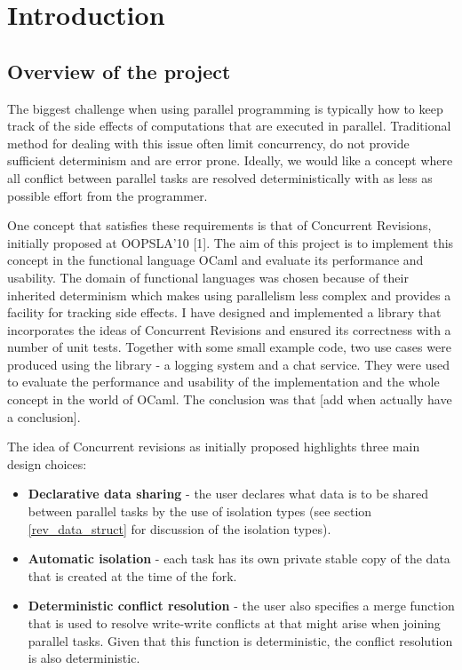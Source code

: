 \documentclass[12pt,twoside,notitlepage]{report}
\begin{document}
\chapter{Introduction}

\section{Overview of the project}
The biggest challenge when using parallel programming is typically how to keep track of the side effects of computations that are executed in parallel. Traditional method for dealing with this issue often limit concurrency, do not provide sufficient determinism and are error prone. Ideally, we would like a concept where all conflict between parallel tasks are resolved deterministically with as less as possible effort from the programmer. 

One concept that satisfies these requirements is that of Concurrent Revisions, initially proposed at OOPSLA'10 [1]. The aim of this project is to implement this concept in the functional language OCaml and evaluate its performance and usability. The domain of functional languages was chosen because of their inherited determinism which makes using parallelism less complex and provides a facility for tracking side effects. I have designed and implemented a library that incorporates the ideas of Concurrent Revisions and ensured its correctness with a number of unit tests. Together with some small example code, two use cases were produced using the library - a logging system and a chat service. They were used to evaluate the performance and usability of the implementation and the whole concept in the world of OCaml. The conclusion was that [add when actually have a conclusion].  

The idea of Concurrent revisions as initially proposed highlights three main design choices:
\begin{itemize}
\item {\bfseries Declarative data sharing} - the user declares what data is to be shared between parallel tasks by the use of isolation types (see section \ref{rev_data_struct} for discussion of the isolation types).  

\item {\bfseries Automatic isolation} - each task has its own private stable copy of the data that is created at the time of the fork.

\item {\bfseries Deterministic conflict resolution} - the user also specifies a merge function that is used to resolve write-write conflicts at that might arise when joining parallel tasks. Given that this function is deterministic, the conflict resolution is also deterministic.

\end{itemize}
\end{document}
